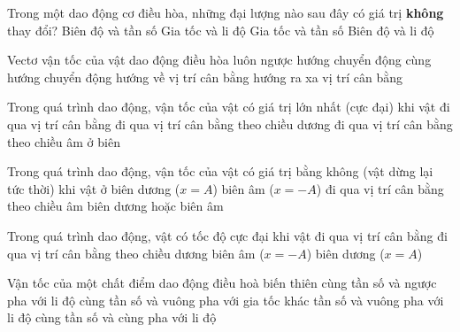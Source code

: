 \setcounter{ex}{0}
\setcounter{paragraph}{0}
\PhanI
\begin{ex}%
Trong một dao động cơ điều hòa, những đại lượng nào sau đây có giá trị \textbf{không} thay đổi?
\choice
{\True Biên độ và tần số}
{Gia tốc và li độ}
{Gia tốc và tần số}
{Biên độ và li độ}
\end{ex} 
\begin{ex}%
Vectơ vận tốc của vật dao động điều hòa luôn
\choice
{ngược hướng chuyển động}
{\True cùng hướng chuyển động}
{hướng về vị trí cân bằng}
{hướng ra xa vị trí cân bằng}
\end{ex} 

\begin{ex}%
Trong quá trình dao động, vận tốc của vật có giá trị lớn nhất (cực đại) khi vật
\choice
{đi qua vị trí cân bằng}
{\True đi qua vị trí cân bằng theo chiều dương}
{đi qua vị trí cân bằng theo chiều âm}
{ở biên}
\end{ex} 
\begin{ex}%
Trong quá trình dao động, vận tốc của vật có giá trị bằng không (vật dừng lại tức thời) khi vật ở
\choice
{biên dương ($x = A$)}
{biên âm ($x = -A$)}
{đi qua vị trí cân bằng theo chiều âm}
{\True biên dương hoặc biên âm}
\end{ex} 

\begin{ex}%
Trong quá trình dao động, vật có tốc độ cực đại khi vật
\choice
{\True đi qua vị trí cân bằng}
{đi qua vị trí cân bằng theo chiều dương}
{biên âm ($x = -A$)}
{biên dương ($x=A$)}
\end{ex} 

\begin{ex}%
Vận tốc của một chất điểm dao động điều hoà biến thiên
\choice
{cùng tần số và ngược pha với li độ}
{\True cùng tần số và vuông pha với gia tốc}
{khác tần số và vuông pha với li độ}
{cùng tần số và cùng pha với li độ}
\end{ex} 

